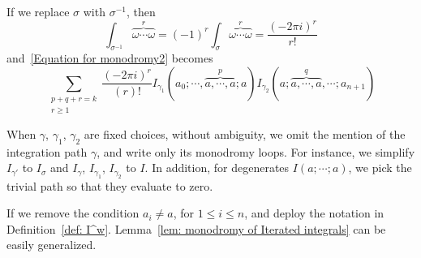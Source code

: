 \begin{remark}
If we replace $\sigma$ with $\sigma^{-1}$, then
\[
\int_{\sigma^{-1}}\overbrace{\omega\cdots\omega}^r=(-1)^r\int_{\sigma}\overbrace{\omega\cdots\omega}^r=\frac{(-2\pi i)^r}{r!}
\]
and~\eqref{Equation for monodromy2} becomes
\begin{equation}\label{eq: equation for monodromy with sign}
\sum_{\substack{p+q+r=k\\r\geq1}}\frac{(-2\pi i)^{r}}{(r)!}I_{\gamma_1}(a_0;\cdots,\overbrace{a,\cdots,a}^p;a)I_{\gamma_2}(a;\overbrace{a,\cdots,a}^q,\cdots;a_{n+1})
\end{equation}
\end{remark}

When $\gamma$, $\gamma_1$, $\gamma_2$ are fixed choices, without ambiguity, we omit the mention of the integration path $\gamma$, and write only its monodromy loops. For instance, we simplify $I_{\gamma'}$ to $I_\sigma$ and $I_\gamma$, $I_{\gamma_1}$, $I_{\gamma_2}$ to $I$. In addition, for degenerates $I(a;\cdots;a)$, we pick the trivial path so that they evaluate to zero.

If we remove the condition $a_i\neq a$, for $1\leq i\leq n$, and deploy the notation in Definition~\ref{def: I^w}. Lemma~\ref{lem: monodromy of Iterated integrals} can be easily generalized.

